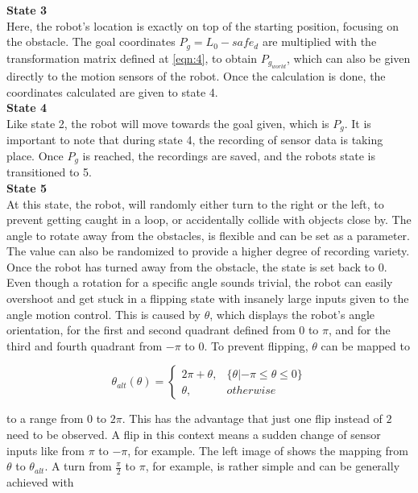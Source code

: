 \textbf{State 3}\\
Here, the robot's location is exactly on top of the starting position, focusing on the obstacle. The goal coordinates $ P_{g} = L_{0} - safe_{d} $ are multiplied with the  transformation matrix defined at \ref{eqn:4}, to obtain $ P_{g_{world}}$, which can also be given directly to the motion sensors of the robot. Once the calculation is done, the coordinates calculated are given to state 4.\\

\textbf{State 4}\\
Like state 2, the robot will move towards the goal given, which is $ P_{g} $. It is important to note that during state 4, the recording of sensor data is taking place. Once $ P_{g} $ is reached, the recordings are saved, and the robots state is transitioned to 5.\\

\textbf{State 5}\\
At this state, the robot, will randomly either turn to the right or the left, to prevent getting caught in a loop, or accidentally collide with objects close by. The angle to rotate away from the obstacles, is flexible and can be set as a parameter. The value can also be randomized to provide a higher degree of recording variety. Once the robot has turned away from the obstacle, the state is set back to 0.\\  

Even though a rotation for a specific angle sounds trivial, the robot can easily overshoot and get stuck in a flipping state with insanely large inputs given to the angle motion control. This is caused by $\theta$, which displays the robot's angle orientation, for the first and second quadrant defined from $ 0 $ to $ \pi $, and for the third and fourth quadrant from $-\pi$ to $ 0 $. To prevent flipping, $\theta$ can be mapped to

\begin{equation}
\label{eqn:5} 
\theta_{alt}(\theta) =
\begin{cases}
2\pi + \theta, &\{\theta |-\pi\leq \theta \leq 0 \}\\
\theta,			&{otherwise}
\end{cases}
\end{equation}

to a range from $ 0 $ to $2\pi$. This has the advantage that just one flip instead of $ 2 $ need to be observed. A flip in this context means a sudden change of sensor inputs like from $\pi$ to $-\pi$, for example. The left image of  shows the mapping from $\theta$ to $\theta_{alt}$. A turn from $\frac{\pi}{2}$ to $\pi$, for example, is rather simple and can be generally achieved with

